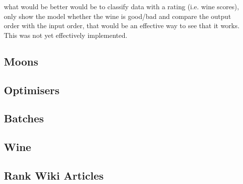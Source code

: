 \documentclass[a4paper,11pt,twoside]{article}
\begin{document}
what would be better would be to classify data with a rating
(i.e. wine scores), only show the model whether the wine is
good/bad and compare the output order with the input order, that
would be an effective way to see that it works. This was not yet
effectively implemented.
\subsection{Moons}
\label{sec:org38acaa2}
\subsection{Optimisers}
\label{sec:orgdf92e25}
\subsection{Batches}
\label{sec:org5e14605}
\subsection{Wine}
\label{sec:org6065e8d}
\subsection{Rank Wiki Articles}
\label{sec:org59b503f}
\end{document}
